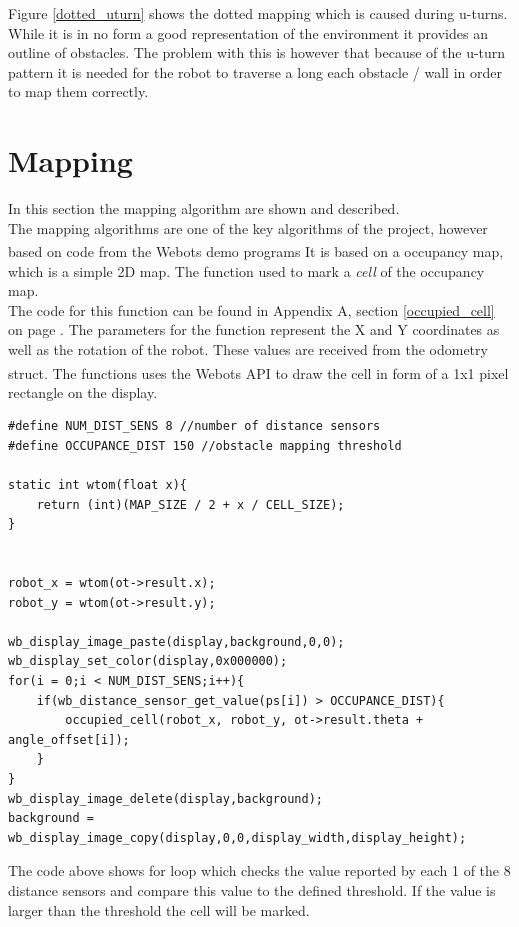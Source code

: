 \begin{flushleft}
Figure \ref{dotted_uturn} shows the dotted mapping which is caused during u-turns. While it is in no form a good representation of the environment it provides an outline of obstacles. The problem with this is however that because of the u-turn pattern it is needed for the robot to traverse a long each obstacle / wall in order to map them correctly. 

\section{Mapping}
In this section the mapping algorithm are shown and described. \\
The mapping algorithms are one of the key algorithms of the project, however based on code from the Webots\textsuperscript{\texttrademark} demo programs It is based on a occupancy map, which is a simple 2D map. The function used to mark a \textit{cell} of the occupancy map.\\
The code for this function can be found in Appendix A, section \ref{occupied_cell} on page \pageref{occupied_cell}.
The parameters for the function represent the X and Y coordinates as well as the rotation of the robot. These values are received from the odometry struct. 
The functions uses the Webots\textsuperscript{\texttrademark}  API to draw the cell in form of a 1x1 pixel rectangle on the display. 

\begin{lstlisting}[caption={obstacle detection and mapping}]
#define NUM_DIST_SENS 8 //number of distance sensors 
#define OCCUPANCE_DIST 150 //obstacle mapping threshold

static int wtom(float x){
	return (int)(MAP_SIZE / 2 + x / CELL_SIZE);
}


robot_x = wtom(ot->result.x);
robot_y = wtom(ot->result.y);

wb_display_image_paste(display,background,0,0);
wb_display_set_color(display,0x000000);
for(i = 0;i < NUM_DIST_SENS;i++){
	if(wb_distance_sensor_get_value(ps[i]) > OCCUPANCE_DIST){
		occupied_cell(robot_x, robot_y, ot->result.theta + angle_offset[i]);
	}
}
wb_display_image_delete(display,background);
background = wb_display_image_copy(display,0,0,display_width,display_height); 
\end{lstlisting}

The code above shows for loop which checks the value reported by each 1 of the 8 distance sensors and compare this value to the defined threshold. If the value is larger than the threshold the cell will be marked. 









 






\end{flushleft}
